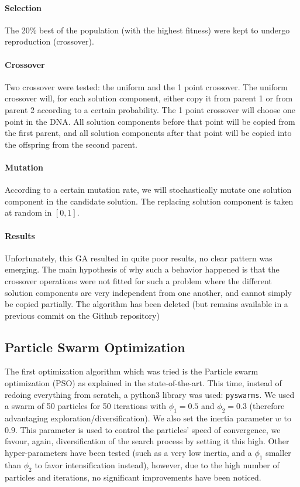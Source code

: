        \paragraph{Selection} The 20\% best of the population (with the highest fitness) were kept to undergo reproduction (crossover).

        \paragraph{Crossover} Two crossover were tested: the uniform and the 1 point crossover. The uniform crossover will, for each solution component, either copy it from parent 1 or from parent 2 according to a certain probability. The 1 point crossover will choose one point in the DNA. All solution components before that point will be copied from the first parent, and all solution components after that point will be copied into the offspring from the second parent.

        \paragraph{Mutation} According to a certain mutation rate, we will stochastically mutate one solution component in the candidate solution. The replacing solution component is taken at random in $[0, 1]$.

        \paragraph{Results} Unfortunately, this GA resulted in quite poor results, no clear pattern was emerging. The main hypothesis of why such a behavior happened is that the crossover operations were not fitted for such a problem where the different solution components are very independent from one another, and cannot simply be copied partially. The algorithm has been deleted (but remains available in a previous commit on the Github repository)

    \subsection{Particle Swarm Optimization}

    The first optimization algorithm which was tried is the Particle swarm optimization (PSO) as explained in the state-of-the-art. This time, instead of redoing everything from scratch, a python3 library was used: \texttt{pyswarms}. We used a swarm of 50 particles for 50 iterations with $\phi_1 = 0.5$ and $\phi_2 = 0.3$ (therefore advantaging exploration/diversification). We also set the inertia parameter $w$ to $0.9$. This parameter is used to control the particles' speed of convergence, we favour, again, diversification of the search process by setting it this high. \cite{psoDorigo} Other hyper-parameters have been tested (such as a very low inertia, and a $\phi_1$ smaller than $\phi_2$ to favor intensification instead), however, due to the high number of particles and iterations, no significant improvements have been noticed.
    
